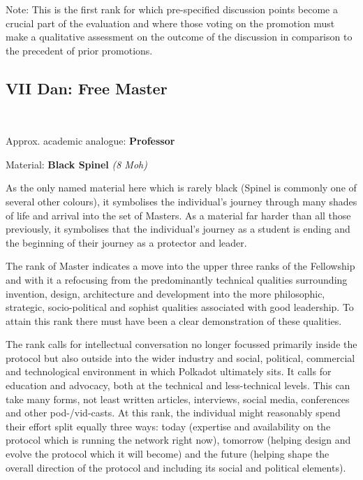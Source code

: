 \documentclass[9pt,oneside]{amsart}
\begin{document}
Note: This is the first rank for which pre-specified discussion points become a crucial part of the evaluation and where those voting on the promotion must make a qualitative assessment on the outcome of the discussion in comparison to the precedent of prior promotions.

\subsection{VII Dan: Free Master}\label{vii-dan-free-master}~\\


Approx. academic analogue: \textbf{Professor}

Material: \textbf{Black Spinel} \emph{(8 Moh)}

As the only named material here which is rarely black (Spinel is commonly one of several other colours), it symbolises the individual's journey through many shades of life and arrival into the set of Masters. As a material far harder than all those previously, it symbolises that the individual's journey as a student is ending and the beginning of their journey as a protector and leader.

The rank of Master indicates a move into the upper three ranks of the Fellowship and with it a refocusing from the predominantly technical qualities surrounding invention, design, architecture and development into the more philosophic, strategic, socio-political and sophist qualities associated with good leadership. To attain this rank there must have been a clear demonstration of these qualities.

The rank calls for intellectual conversation no longer focussed primarily inside the protocol but also outside into the wider industry and social, political, commercial and technological environment in which Polkadot ultimately sits. It calls for education and advocacy, both at the technical and less-technical levels. This can take many forms, not least written articles, interviews, social media, conferences and other pod-/vid-casts. At this rank, the individual might reasonably spend their effort split equally three ways: today (expertise and availability on the protocol which is running the network right now), tomorrow (helping design and evolve the protocol which it will become) and the future (helping shape the overall direction of the protocol and including its social and political elements).
\end{document}
